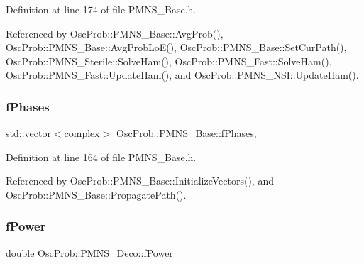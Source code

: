 Definition at line 174 of file P\+M\+N\+S\+\_\+\+Base.\+h.



Referenced by Osc\+Prob\+::\+P\+M\+N\+S\+\_\+\+Base\+::\+Avg\+Prob(), Osc\+Prob\+::\+P\+M\+N\+S\+\_\+\+Base\+::\+Avg\+Prob\+Lo\+E(), Osc\+Prob\+::\+P\+M\+N\+S\+\_\+\+Base\+::\+Set\+Cur\+Path(), Osc\+Prob\+::\+P\+M\+N\+S\+\_\+\+Sterile\+::\+Solve\+Ham(), Osc\+Prob\+::\+P\+M\+N\+S\+\_\+\+Fast\+::\+Solve\+Ham(), Osc\+Prob\+::\+P\+M\+N\+S\+\_\+\+Fast\+::\+Update\+Ham(), and Osc\+Prob\+::\+P\+M\+N\+S\+\_\+\+N\+S\+I\+::\+Update\+Ham().

\mbox{\label{classOscProb_1_1PMNS__Base_a2fcb59d7c533e4cd963b1890e504d3dc}} 
\subsubsection{\texorpdfstring{f\+Phases}{fPhases}}
{\footnotesize\ttfamily std\+::vector$<$\hyperlink{classOscProb_1_1PMNS__Base_ae86ec4718808ce9d02e5f5b4226714ab}{complex}$>$ Osc\+Prob\+::\+P\+M\+N\+S\+\_\+\+Base\+::f\+Phases\hspace{0.3cm}{\ttfamily [protected]}, {\ttfamily [inherited]}}



Definition at line 164 of file P\+M\+N\+S\+\_\+\+Base.\+h.



Referenced by Osc\+Prob\+::\+P\+M\+N\+S\+\_\+\+Base\+::\+Initialize\+Vectors(), and Osc\+Prob\+::\+P\+M\+N\+S\+\_\+\+Base\+::\+Propagate\+Path().

\mbox{\label{classOscProb_1_1PMNS__Deco_a19fdcdf9a8b2bd9677f72ca1fd77dc3e}} 
\subsubsection{\texorpdfstring{f\+Power}{fPower}}
{\footnotesize\ttfamily double Osc\+Prob\+::\+P\+M\+N\+S\+\_\+\+Deco\+::f\+Power\hspace{0.3cm}{\ttfamily [protected]}}



